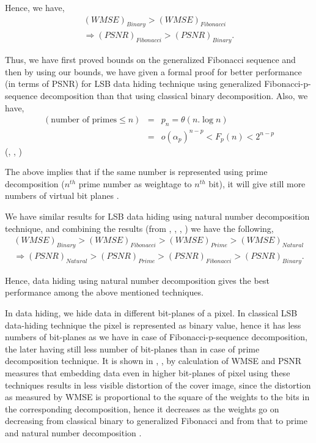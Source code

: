 \documentclass{ijcsa}
\begin{document}
\par Hence, we have,
\begin{eqnarray*}
{\left(WMSE\right)}_{Binary} >{\left(WMSE\right)}_{Fibonacci} \\
\Rightarrow {\left(PSNR\right)}_{Fibonacci} > {\left(PSNR\right)}_{Binary}.
\end{eqnarray*}

\par Thus, we have first proved bounds on the generalized Fibonacci sequence and then by using our bounds, 
we have given a formal proof for better performance (in terms of PSNR) for LSB data hiding technique using 
generalized Fibonacci-p-sequence decomposition than that using classical binary decomposition. Also, we have,
\begin{eqnarray*}
(\mbox{number of primes} \leq n) &=& p_{n}=\theta{(n.\log{n})} \\
&=& o(\alpha_{p})^{n-p} < F_{p}(n) < 2^{n-p}
\end{eqnarray*}
{ (\cite{telang99}, \cite{niven66}, \cite{tatt05})}
\par The above implies that if the same number is represented using prime decomposition ($n^{th}$ prime number as weightage 
to $n^{th}$ bit), it will give still more numbers of virtual bit planes \cite{battisti06}. 

\par We have similar results for LSB data hiding using natural number decomposition technique, and combining the results 
(from \cite{battisti06}, \cite{dey07a}, \cite{dey07b}, \cite{dey08}) we have the following,
\begin{eqnarray*}
{\left(WMSE\right)}_{Binary} >{\left(WMSE\right)}_{Fibonacci} > {\left(WMSE\right)}_{Prime}>{\left(WMSE\right)}_{Natural}\\
\Rightarrow {\left(PSNR\right)}_{Natural}>{\left(PSNR\right)}_{Prime}>{\left(PSNR\right)}_{Fibonacci} > {\left(PSNR\right)}_{Binary}.
\end{eqnarray*}

\par Hence, data hiding using natural number decomposition gives the best performance among the above mentioned techniques.

\par In data hiding, we hide data in different bit-planes of a pixel. In classical LSB data-hiding technique the 
pixel is represented as binary value, hence it has less numbers of bit-planes as we have in case of Fibonacci-p-sequence 
decomposition, the later having still less number of bit-planes than in case of prime decomposition technique.
It is shown in \cite{dey07a}, \cite{dey07b}, \cite{dey08} by calculation of WMSE and PSNR measures that embedding data even 
in higher bit-planes of pixel using these techniques results in less visible distortion of the cover image, since the distortion
as measured by WMSE is proportional to the square of the weights to the bits in the corresponding decomposition, hence it decreases
as the weights go on decreasing from classical binary to generalized Fibonacci and from that to prime and natural number decomposition \cite{dey08}.
\end{document}
